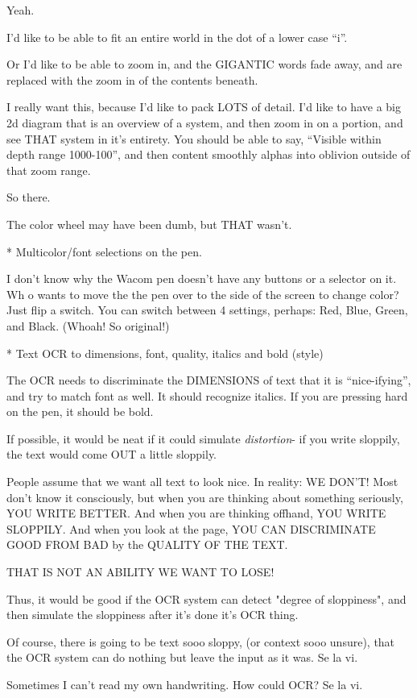\documentclass[oneside]{book}
\begin{document}
Yeah.

I'd like to be able to fit an entire world in the dot of a lower case
``i''.

Or I'd like to be able to zoom in, and the GIGANTIC words fade away,
and are replaced with the zoom in of the contents beneath.

I really want this, because I'd like to pack LOTS of detail. I'd like
to have a big 2d diagram that is an overview of a system, and then
zoom in on a portion, and see THAT system in it's entirety. You should
be able to say, ``Visible within depth range 1000-100'', and then
content smoothly alphas into oblivion outside of that zoom range.

So there.

The color wheel may have been dumb, but THAT wasn't.

* Multicolor/font selections on the pen.

I don't know why the Wacom pen doesn't have any buttons or a selector on it. Wh
o
wants to move the the pen over to the side of the screen to change
color? Just flip a switch. You can switch between 4 settings, perhaps:
Red, Blue, Green, and Black. (Whoah! So original!)

* Text OCR to dimensions, font, quality, italics and bold (style)

The OCR needs to discriminate the DIMENSIONS of text that it is
``nice-ifying'', and try to match font as well. It should recognize
italics. If you are pressing hard on the pen, it should be bold.

If possible, it would be neat if it could simulate \emph{distortion}- if
you write sloppily, the text would come OUT a little sloppily.

People assume that we want all text to look nice.
In reality: WE DON'T! Most don't know it consciously, but when you are
thinking about something seriously, YOU WRITE BETTER. And when you are
thinking offhand, YOU WRITE SLOPPILY. And when you look at the page,
YOU CAN DISCRIMINATE GOOD FROM BAD by the QUALITY OF THE TEXT.

THAT IS NOT AN ABILITY WE WANT TO LOSE!

Thus, it would be good if the OCR system can detect "degree of
sloppiness", and then simulate the sloppiness after it's done it's OCR
thing.

Of course, there is going to be text sooo sloppy, (or context sooo
unsure), that the OCR system can do nothing but leave the input as it
was. Se la vi.

Sometimes I can't read my own handwriting. How could OCR? Se la vi.
\end{document}
